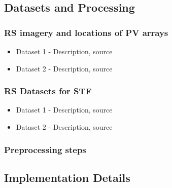 \begin{multicols}{2}

\subsection{Datasets and Processing}
\subsubsection{RS imagery and locations of PV arrays}
    \begin{itemize}
        \item Dataset 1 - Description, source
        \item Dataset 2 - Description, source
    \end{itemize}
\subsubsection{RS Datasets for STF}
    \begin{itemize}
        \item Dataset 1 - Description, source
        \item Dataset 2 - Description, source
    \end{itemize}
\subsubsection{Preprocessing steps}
    

\subsection{Implementation Details}

\end{multicols}

